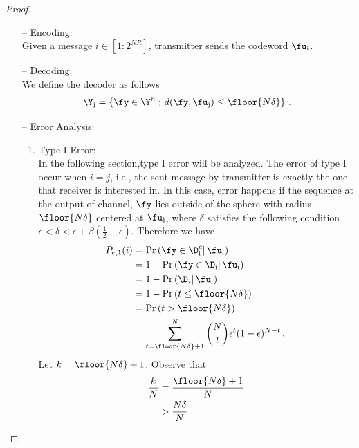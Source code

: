 \begin{proof}
\begin{itemize}
\item  [--] Encoding: \\
Given a message $i \in [1:2^{NR}]$, transmitter sends the codeword $\fu_{\text{i}}$.
\item [--] Decoding: \\
We define the decoder as follows
\begin{align}
    \Y_{\text{j}}= \left\{ \fy \in \Y^n \;;\, d(\fy,\fu_{\text{j}}) \leq \floor{N\delta} \right\} \,.\,
\end{align}
\item [--] Error Analysis: \\
    \begin{enumerate}
        \item Type I Error: \\
        In the following section,type I error will be analyzed. The error of type I occur when $i=j$, i.e., the sent message by transmitter is exactly the one that receiver is interested in. In this case, error happens if the sequence at the output of channel, $\fy$ lies outside of the sphere with radius $\floor{N\delta}$ centered at $\fu_{\text{j}}$, where $\delta$ satisfies the following condition $\epsilon<\delta<\epsilon+ \beta(\frac{1}{2}-\epsilon)$. Therefore we have
\begin{align}
P_{e,1}(i) & = \Pr\left( \fy \in \D_{\text{i}}^c |\, \fu_{\text{i}} \right)
\nonumber\\
& = 1 - \Pr\left( \fy \in \D_{\text{i}} |\, \fu_{\text{i}} \right)
\nonumber\\
& = 1 - \Pr\left( \D_i |\, \fu_{\text{i}} \right)
\nonumber\\
& = 1 - \Pr\left(t \leq \floor{N\delta} \right)
\nonumber\\
& = \Pr\left(t > \floor{N\delta} \right)
\nonumber\\
& = \sum_{t=\floor{N\delta}+1}^{N} \binom{N}{t} \epsilon^t (1-\epsilon)^{N-t} \,.\,
\end{align}
Let $k=\floor{N\delta}+1$. Observe that
\begin{align}
    \label{Ineq.Cond_3}
    \frac{k}{N} & = \frac{\floor{N\delta}+1}{N}
    \nonumber\\
    &>\frac{N\delta}{N}

\end{align}
\end{enumerate}
\end{itemize}
\end{proof}
